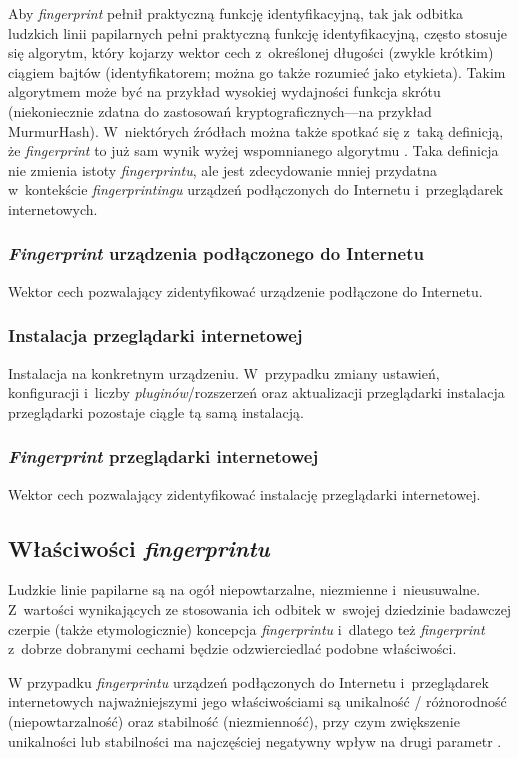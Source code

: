 Aby \emph{fingerprint} pełnił praktyczną funkcję identyfikacyjną, tak jak
odbitka ludzkich linii papilarnych pełni praktyczną funkcję identyfikacyjną,
często stosuje się algorytm, który kojarzy wektor cech z~określonej długości
(zwykle krótkim) ciągiem bajtów (identyfikatorem; można go także rozumieć jako
etykieta). Takim algorytmem może być na przykład wysokiej wydajności funkcja
skrótu (niekoniecznie zdatna do zastosowań kryptograficznych---na przykład
MurmurHash). W~niektórych źródłach można także spotkać się z~taką definicją, że
\emph{fingerprint} to już sam wynik wyżej wspomnianego algorytmu \cite[s.
123--132]{wu2018beauty}. Taka definicja nie zmienia istoty \emph{fingerprintu},
ale jest zdecydowanie mniej przydatna w~kontekście \emph{fingerprintingu}
urządzeń podłączonych do Internetu i~przeglądarek internetowych.

\subsubsection{\emph{Fingerprint} urządzenia podłączonego do Internetu}
Wektor cech pozwalający zidentyfikować urządzenie podłączone do Internetu.

\subsubsection{Instalacja przeglądarki internetowej}
Instalacja na konkretnym urządzeniu. W~przypadku zmiany ustawień, konfiguracji
i~liczby \emph{pluginów}/rozszerzeń oraz aktualizacji przeglądarki instalacja
przeglądarki pozostaje ciągle tą samą instalacją.

\subsubsection{\emph{Fingerprint} przeglądarki internetowej}
Wektor cech pozwalający zidentyfikować instalację przeglądarki internetowej.

\subsection{Właściwości \emph{fingerprintu}}
Ludzkie linie papilarne są na ogół niepowtarzalne, niezmienne i~nieusuwalne.
Z~wartości wynikających ze stosowania ich odbitek w~swojej dziedzinie badawczej
czerpie (także etymologicznie) koncepcja \emph{fingerprintu} i~dlatego też
\emph{fingerprint} z~dobrze dobranymi cechami będzie odzwierciedlać podobne
właściwości.

W przypadku \emph{fingerprintu} urządzeń podłączonych do Internetu
i~przeglądarek internetowych najważniejszymi jego właściwościami są unikalność /
różnorodność (niepowtarzalność) oraz stabilność (niezmienność), przy czym
zwiększenie unikalności lub stabilności ma najczęściej negatywny wpływ na drugi
parametr \cite[s. 11]{eckersley2010unique}.

